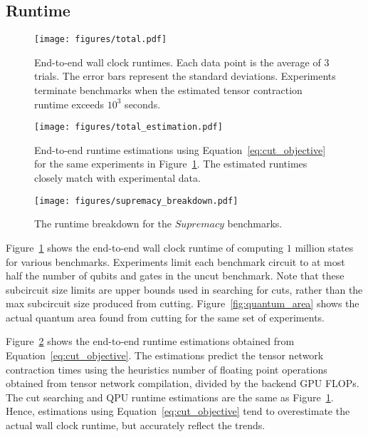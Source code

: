 \subsection{Runtime}\label{sec:runtime_results}
\begin{figure}[t]
    \centering
    \texttt{[image: figures/total.pdf]}
    \caption{End-to-end wall clock runtimes.
    Each data point is the average of $3$ trials.
    The error bars represent the standard deviations.
    Experiments terminate benchmarks when the estimated tensor contraction runtime exceeds $10^3$ seconds.}
    \label{fig:total_runtime}
\end{figure}

\begin{figure}[t]
    \centering
    \texttt{[image: figures/total\_estimation.pdf]}
    \caption{End-to-end runtime estimations using Equation~\ref{eq:cut_objective} for the same experiments in Figure~\ref{fig:total_runtime}.
    The estimated runtimes closely match with experimental data.}
    \label{fig:total_runtime_estimation}
\end{figure}

\begin{figure}[t]
    \centering
    \texttt{[image: figures/supremacy\_breakdown.pdf]}
    \caption{The runtime breakdown for the $Supremacy$ benchmarks.}
    \label{fig:runtime_breakdown}
\end{figure}

Figure~\ref{fig:total_runtime} shows the end-to-end wall clock runtime of computing $1$ million states for various benchmarks.
Experiments limit each benchmark circuit to at most half the number of qubits and gates in the uncut benchmark.
Note that these subcircuit size limits are upper bounds used in searching for cuts,
rather than the max subcircuit size produced from cutting.
Figure~\ref{fig:quantum_area} shows the actual quantum area found from cutting for the same set of experiments.

Figure~\ref{fig:total_runtime_estimation} shows the end-to-end runtime estimations obtained from Equation~\ref{eq:cut_objective}.
The estimations predict the tensor network contraction times using the heuristics number of floating point operations obtained from tensor network compilation,
divided by the backend GPU FLOPs.
The cut searching and QPU runtime estimations are the same as Figure~\ref{fig:total_runtime}.
Hence, estimations using Equation~\ref{eq:cut_objective} tend to overestimate the actual wall clock runtime,
but accurately reflect the trends.

